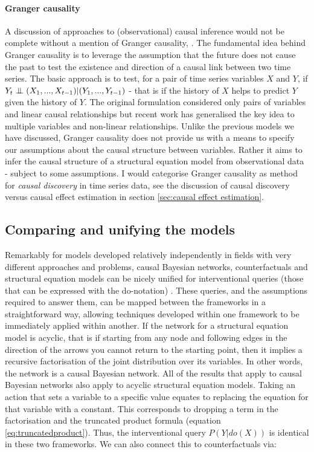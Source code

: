 \documentclass[11pt,a4paper,twoside]{report}
\theoremstyle{plain}
\theoremstyle{definition}
\newcommand{\ci}{\mathrel{\perp\mspace{-10mu}\perp}}
\begin{document}
\paragraph{Granger causality}
A discussion of approaches to (observational) causal inference would not be complete without a mention of Granger causality, \citep{Granger1969}. The fundamental idea behind Granger causality is to leverage the assumption that the future does not cause the past to test the existence and direction of a causal link between two time series. The basic approach is to test, for a pair of time series variables $X$ and $Y$, if $Y_t \ci (X_{1},...,X_{t-1}) | (Y_{1},...,Y_{t-1})$ - that is if the history of $X$ helps to predict $Y$ given the history of $Y$. The original formulation considered only pairs of variables and linear causal relationships but recent work has generalised the key idea to multiple variables and non-linear relationships. Unlike the previous models we have discussed, Granger causality does not provide us with a means to specify our assumptions about the causal structure between variables. Rather it aims to infer the causal structure of a structural equation model from observational data - subject to some assumptions. I would categorise Granger causality as method for \emph{causal discovery} in time series data, see the discussion of causal discovery versus causal effect estimation in section \ref{sec:causal effect estimation}.


\subsection{Comparing and unifying the models}
\label{sec:unifying_causal_models}

Remarkably for models developed relatively independently in fields with very different approaches and problems, causal Bayesian networks, counterfactuals and structural equation models can be nicely unified for interventional queries (those that can be expressed with the do-notation) \citep{Pearl2000}. These queries, and the assumptions required to answer them, can be mapped between the frameworks in a straightforward way, allowing techniques developed within one framework to be immediately applied within another. If the network for a structural equation model is acyclic, that is if starting from any node and following edges in the direction of the arrows you cannot return to the starting point, then it implies a recursive factorisation of the joint distribution over its variables. In other words, the network is a causal Bayesian network. All of the results that apply to causal Bayesian networks also apply to acyclic structural equation models.  Taking an action that sets a variable to a specific value equates to replacing the equation for that variable with a constant. This corresponds to dropping a term in the factorisation and the truncated product formula (equation \ref{eq:truncatedproduct}). Thus, the interventional query $P(Y|do(X))$ is identical in these two frameworks. We can also connect this to counterfactuals via:
\end{document}
